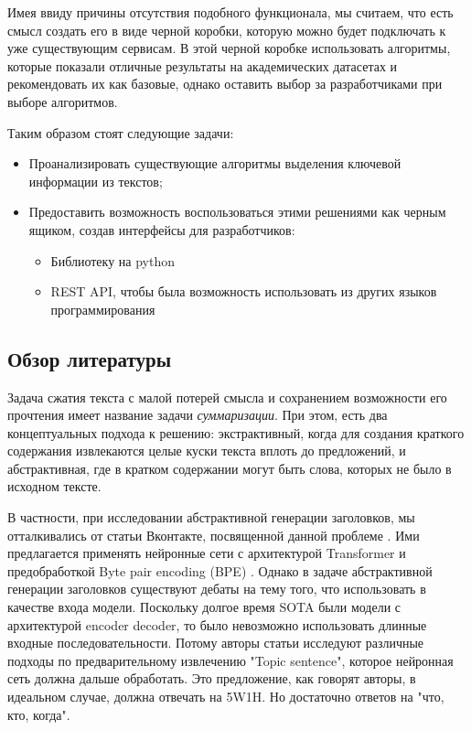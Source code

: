 \documentclass[aps,%
12pt,%
final,%
oneside,
onecolumn,%
musixtex, %
superscriptaddress,%
centertags]{article} %
\begin{document}
Имея ввиду причины отсутствия подобного функционала, мы считаем, что есть смысл создать его в виде
черной коробки, которую можно будет подключать к уже существующим сервисам. В этой черной коробке
использовать алгоритмы, которые показали отличные результаты на академических датасетах и рекомендовать их как базовые, однако оставить выбор за разработчиками при выборе алгоритмов.

Таким образом стоят следующие задачи:

\begin{itemize}
  \item Проанализировать существующие алгоритмы выделения ключевой информации из текстов;
  \item Предоставить возможность воспользоваться этими решениями как черным ящиком, создав интерфейсы для разработчиков:
  \begin{itemize}
    \item Библиотеку на python
    \item REST API, чтобы была возможность использовать из других языков программирования
  \end{itemize}
\end{itemize}

\subsection{Обзор литературы}
Задача сжатия текста с малой потерей смысла и сохранением возможности его прочтения
имеет название задачи \textit{суммаризации}. При этом, есть два концептуальных подхода к решению:
экстрактивный, когда для создания краткого содержания извлекаются целые куски текста вплоть до предложений,
и абстрактивная, где в кратком содержании могут быть слова, которых не было в исходном тексте.

В частности, при исследовании абстрактивной генерации заголовков, мы отталкивались от статьи Вконтакте, посвященной данной проблеме \cite{gavrilov2018self}. Ими предлагается применять нейронные сети с архитектурой Transformer и предобработкой Byte pair encoding (BPE) \cite{DBLP:journals/corr/SennrichHB15}. Однако в задаче абстрактивной генерации заголовков существуют дебаты на тему того, что использовать в качестве входа модели. Поскольку долгое время SOTA были модели с архитектурой encoder decoder, то было невозможно использовать длинные входные последовательности. Потому авторы статьи \cite{Putra2018IncorporatingTS} исследуют различные подходы по предварительному извлечению "Topic sentence", которое нейронная сеть должна дальше обработать. Это предложение, как говорят авторы, в идеальном случае, должна отвечать на 5W1H. Но достаточно ответов на "что, кто, когда".
\end{document}
